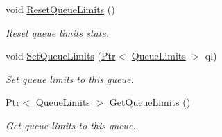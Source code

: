 \begin{DoxyCompactItemize}
void \hyperlink{classns3_1_1NetDeviceQueue_a4de87b16e1e556608aa8f23bc590a0de}{Reset\+Queue\+Limits} ()
\begin{DoxyCompactList}\small\item\em Reset queue limits state. \end{DoxyCompactList}\item 
void \hyperlink{classns3_1_1NetDeviceQueue_a2ee44bb945c17d31e70f9c4ac651465b}{Set\+Queue\+Limits} (\hyperlink{classns3_1_1Ptr}{Ptr}$<$ \hyperlink{classns3_1_1QueueLimits}{Queue\+Limits} $>$ ql)
\begin{DoxyCompactList}\small\item\em Set queue limits to this queue. \end{DoxyCompactList}\item 
\hyperlink{classns3_1_1Ptr}{Ptr}$<$ \hyperlink{classns3_1_1QueueLimits}{Queue\+Limits} $>$ \hyperlink{classns3_1_1NetDeviceQueue_a271d0613d179ead88394a9733f1a0628}{Get\+Queue\+Limits} ()
\begin{DoxyCompactList}\small\item\em Get queue limits to this queue. \end{DoxyCompactList}\end{DoxyCompactItemize}
